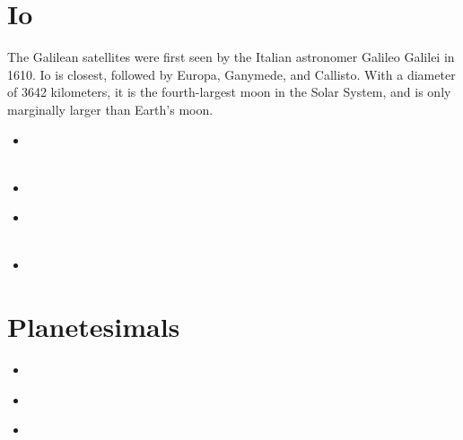 \section{Io}

The Galilean satellites were first seen by the Italian astronomer Galileo Galilei in 1610. 
Io is closest, followed by Europa, Ganymede, and Callisto.
With a diameter of 3642 kilometers, it is the fourth-largest moon in the Solar System, 
and is only marginally larger than Earth's moon.

\begin{small}
\begin{itemize}
\item[\twothousandone]
 \\ 
 \\
\item[\twothousandthirteen] 
\item[\twothousandtwenty] 
 \\ 
 \\
\item[\twothousandtwentytwo] 
\end{itemize}
\end{small}

\section{Planetesimals}

\begin{small}
\begin{itemize}
\item[\twothousandfourteen]
\item[\twothousandnineteen]
 \\
\item[\twothousandtwentyone]
\end{itemize}
\end{small}



